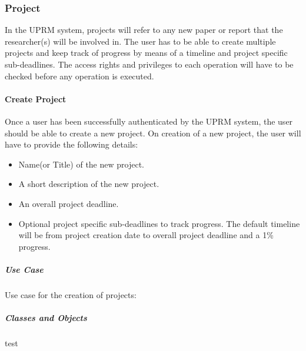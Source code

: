 \subsubsection{Project}
	In the UPRM system, projects will refer to any new paper or report that the researcher(s) will be involved in. The user has to be able to create multiple projects and keep track of progress by means of a timeline and project specific sub-deadlines.
	The access rights and privileges to each operation will have to be checked before any operation is executed.\\
	
	\centerline{}
	
	\setcounter{secnumdepth}{4}
	\paragraph{Create Project\\}
	Once a user has been successfully authenticated by the UPRM system, the user should be able to create a new project. On creation of a new project, the user will have to provide the following details:
	\begin{itemize}
		\item Name(or Title) of the new project.
		\item A short description of the new project.
		\item An overall project deadline.
		\item Optional project specific sub-deadlines to track progress. The default timeline will be from project creation date to overall project deadline and a 1\% progress.
	\end{itemize} 
	
	\setcounter{secnumdepth}{5}
	\subparagraph{Use Case\\}
		Use case for the creation of projects:\\
		\centerline{}
	
	\subparagraph{Classes and Objects\\}
	test
	